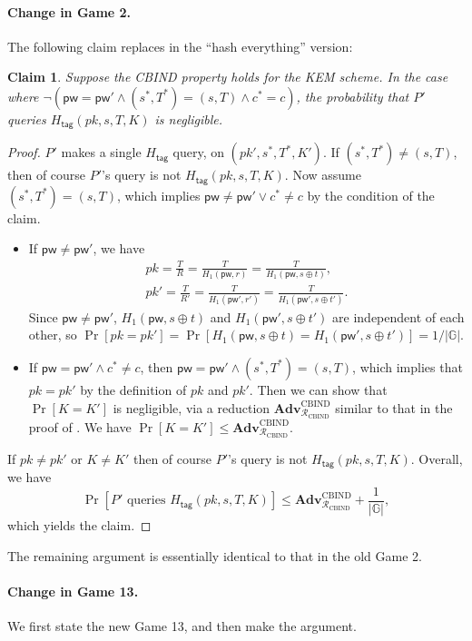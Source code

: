 \documentclass{article}
\theoremstyle{plain}
\newtheorem{claim}{Claim}
\theoremstyle{definition}
\theoremstyle{remark}
\newcommand{\group}{\mathbb{G}}
\newcommand{\red}{\mathcal{R}}
\newcommand{\Adv}{\mathbf{Adv}}
\newcommand{\Htag}{H_\mathsf{tag}}
\newcommand{\pw}{\mathsf{pw}}
\begin{document}
\paragraph{Change in Game 2.}
The following claim replaces  in the ``hash everything'' version:
\begin{claim}
\label{clm:htag3}
Suppose the CBIND property holds for the KEM scheme. In the case where $\neg(\pw = \pw' \land (s^*,T^*) = (s,T) \land c^* = c)$, the probability that $P'$ queries $\Htag(pk,s,T,K)$ is negligible.
\end{claim}
\begin{proof}
$P'$ makes a single $\Htag$ query, on $(pk',s^*,T^*,K')$. If $(s^*,T^*) \neq (s,T)$, then of course $P'$'s query is not $\Htag(pk,s,T,K)$. Now assume $(s^*,T^*) = (s,T)$, which implies $\pw \neq \pw' \lor c^* \neq c$ by the condition of the claim.
\begin{itemize}
    \item If $\pw \neq \pw'$, we have
      \begin{gather*}
      pk = \frac{T}{R} = \frac{T}{H_1(\pw,r)} = \frac{T}{H_1(\pw,s \oplus t)}, \\
      pk' = \frac{T}{R'} = \frac{T}{H_1(\pw',r')} = \frac{T}{H_1(\pw',s \oplus t')}.
      \end{gather*}
      Since $\pw \neq \pw'$, $H_1(\pw,s \oplus t)$ and $H_1(\pw',s \oplus t')$ are independent of each other, so $\Pr[pk = pk'] = \Pr[H_1(\pw,s \oplus t) = H_1(\pw',s \oplus t')] = 1/|\group|$.
  \item If $\pw = \pw' \land c^* \neq c$, then $\pw = \pw' \land (s^*,T^*) = (s,T)$, which implies that $pk = pk'$ by the definition of $pk$ and $pk'$. Then we can show that $\Pr[K = K']$ is negligible, via a reduction $\Adv_{\red_\text{CBIND}}^\text{CBIND}$ similar to that in the proof of . We have $\Pr[K = K'] \leq \Adv_{\red_\text{CBIND}}^\text{CBIND}$.
\end{itemize}

If $pk \neq pk'$ or $K \neq K'$ then of course $P'$'s query is not $\Htag(pk,s,T,K)$. Overall, we have
\[
\Pr[P'\text{ queries }\Htag(pk,s,T,K)] \leq \Adv_{\red_\text{CBIND}}^\text{CBIND} + \frac{1}{|\group|},
\]
which yields the claim.
\end{proof}
The remaining argument is essentially identical to that in the old Game 2.

\paragraph{Change in Game 13.}
We first state the new Game 13, and then make the argument.
\end{document}
